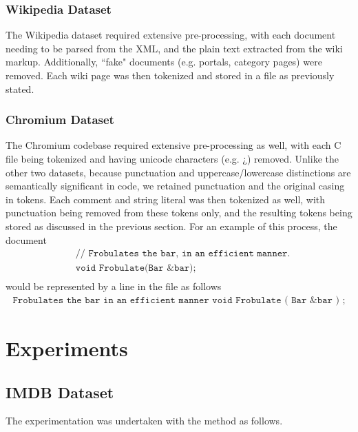 \documentclass[11pt]{article}
\newcommand{\CPP}
{C\nolinebreak[4]\hspace{-.05em}\raisebox{.22ex}{\footnotesize\bf ++\ }}
\begin{document}
\subsubsection*{Wikipedia Dataset}
The Wikipedia dataset required extensive pre-processing, with each document
needing to be parsed from the XML, and the plain text extracted from the wiki
markup. Additionally, ``fake" documents (e.g. portals, category pages) were
removed. Each wiki page was then tokenized and stored in a file as previously
stated.

\subsubsection*{Chromium Dataset}
The Chromium codebase required extensive pre-processing as well, with each \CPP
file being tokenized and having unicode characters (e.g. ¿) removed.
Unlike the other two datasets, because punctuation and uppercase/lowercase
distinctions are semantically significant in code, we retained punctuation and
the original casing in tokens.
Each comment and string literal was then tokenized as well, with punctuation
being removed from these tokens only, and the resulting tokens being stored as
discussed in the previous section. For an example of this process, the
document
\begin{align*}
&\texttt{// Frobulates the bar, in an efficient manner.}\\
&\texttt{void Frobulate(Bar \&bar);}\\
\end{align*}
would be represented by a line in the file as follows\\
\begin{align*}
\texttt{Frobulates the bar in an efficient manner void Frobulate ( Bar \& bar ) ;}
\end{align*}


\section*{Experiments}

\subsection*{IMDB Dataset}
The experimentation was undertaken with the method as follows. 
\end{document}
